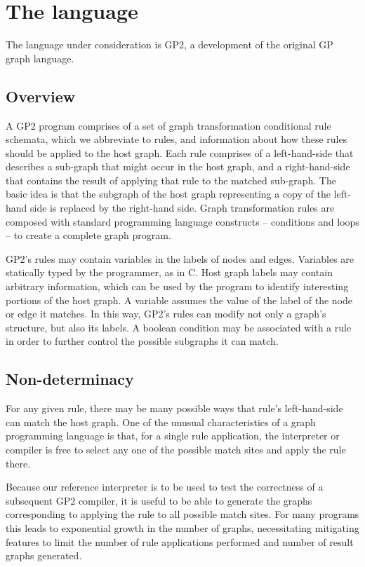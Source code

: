 
\section{The language}


The language under consideration is GP2\cite{plump2012design}, a development of the original GP graph language\cite{plump2009graph}.


\subsection{Overview}

A GP2 program comprises of a set of graph transformation conditional rule schemata, which we abbreviate to rules, and information about how these rules should be applied to the host graph. Each rule comprises of a left-hand-side that describes a sub-graph that might occur in the host graph, and a right-hand-side that contains the result of applying that rule to the matched sub-graph. The basic idea is that the subgraph of the host graph representing a copy of the left-hand side is replaced by the right-hand side. Graph transformation rules are composed with standard programming language constructs -- conditions and loops -- to create a complete graph program.


GP2’s rules may contain variables in the labels of nodes and edges. Variables are statically typed by the programmer, as in C. Host graph labels may contain arbitrary information, which can be used by the program to identify interesting portions of the host graph. A variable assumes the value of the label of the node or edge it matches. In this way, GP2’s rules can modify not only a graph’s structure, but also its labels. A boolean condition may be associated with a rule in order to further control the possible subgraphs it can match.


\subsection{Non-determinacy}


For any given rule, there may be many possible ways that rule’s left-hand-side can match the host graph. One of the unusual characteristics of a graph programming language is that, for a single rule application, the interpreter or compiler is free to select any one of the possible match sites and apply the rule there.


Because our reference interpreter is to be used to test the correctness of a subsequent GP2 compiler, it is useful to be able to generate the graphs corresponding to applying the rule to all possible match sites. For many programs this leads to exponential growth in the number of graphs, necessitating mitigating features to limit the number of rule applications performed and number of result graphs generated.

